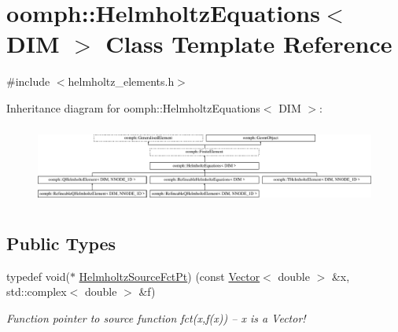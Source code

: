 \hypertarget{classoomph_1_1HelmholtzEquations}{}\section{oomph\+:\+:Helmholtz\+Equations$<$ D\+IM $>$ Class Template Reference}
\label{classoomph_1_1HelmholtzEquations}


{\ttfamily \#include $<$helmholtz\+\_\+elements.\+h$>$}

Inheritance diagram for oomph\+:\+:Helmholtz\+Equations$<$ D\+IM $>$\+:\begin{figure}[H]
\begin{center}
\leavevmode
\includegraphics[height=2.629108cm]{classoomph_1_1HelmholtzEquations}
\end{center}
\end{figure}
\subsection*{Public Types}
\begin{DoxyCompactItemize}
\item 
typedef void($\ast$ \hyperlink{classoomph_1_1HelmholtzEquations_a630648023d91bba9ee9a900353a1ea58}{Helmholtz\+Source\+Fct\+Pt}) (const \hyperlink{classoomph_1_1Vector}{Vector}$<$ double $>$ \&x, std\+::complex$<$ double $>$ \&f)
\begin{DoxyCompactList}\small\item\em Function pointer to source function fct(x,f(x)) -- x is a Vector! \end{DoxyCompactList}\end{DoxyCompactItemize}
